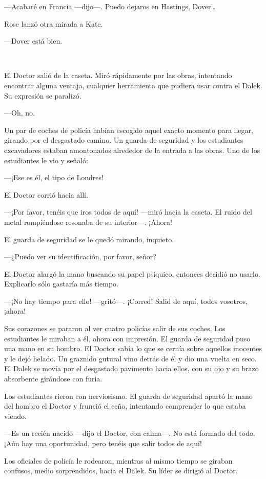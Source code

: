 ---Acabaré en Francia ---dijo---. Puedo dejaros en Hastings, Dover\ldots{}

Rose lanzó otra mirada a Kate.

---Dover está bien.

~

El Doctor salió de la caseta. Miró rápidamente por las obras, intentando
encontrar alguna ventaja, cualquier herramienta que pudiera usar contra
el Dalek. Su expresión se paralizó.

---Oh, no.

Un par de coches de policía habían escogido aquel exacto momento para
llegar, girando por el desgastado camino. Un guarda de seguridad y los
estudiantes excavadores estaban amontonados alrededor de la entrada a
las obras. Uno de los estudiantes le vio y señaló:

---¡Ese es él, el tipo de Londres!

El Doctor corrió hacia allí.

---¡Por favor, tenéis que iros todos de aquí! ---miró hacia la caseta. El
ruido del metal rompiéndose resonaba de su interior---. ¡Ahora!

El guarda de seguridad se le quedó mirando, inquieto.

---¿Puedo ver su identificación, por favor, señor?

El Doctor alargó la mano buscando su papel psíquico, entonces decidió no
usarlo. Explicarlo sólo gastaría más tiempo.

---¡No hay tiempo para ello! ---gritó---. ¡Corred! Salid de aquí, todos
vosotros, ¡ahora!

Sus corazones se pararon al ver cuatro policías salir de sus coches. Los
estudiantes le miraban a él, ahora con impresión. El guarda de seguridad
puso una mano en su hombro. El Doctor sabía lo que se cernía sobre
aquellos inocentes y le dejó helado. Un graznido gutural vino detrás de
él y dio una vuelta en seco. El Dalek se movía por el desgastado
pavimento hacia ellos, con su ojo y su brazo absorbente girándose con
furia.

Los estudiantes rieron con nerviosismo. El guarda de seguridad apartó la
mano del hombro el Doctor y frunció el ceño, intentando comprender lo
que estaba viendo.

---Es un recién nacido ---dijo el Doctor, con calma---. No está formado del
todo. ¡Aún hay una oportunidad, pero tenéis que salir todos de aquí!

Los oficiales de policía le rodearon, mientras al mismo tiempo se
giraban confusos, medio sorprendidos, hacia el Dalek. Su líder se
dirigió al Doctor.

